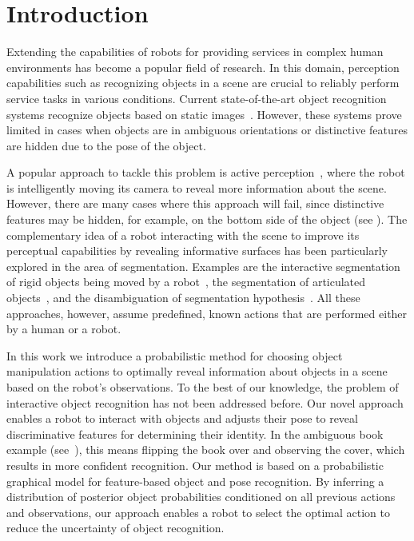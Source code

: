 
\section{Introduction}
    \vspace{-0.5ex}


Extending the capabilities of robots for providing services in complex human environments has become a popular field of research.
In this domain, perception capabilities such as recognizing objects in a scene are crucial to reliably perform service tasks in various conditions.
Current state-of-the-art object recognition systems recognize objects based on static images~\cite{tang2012textured,van2013fusing}.
However, these systems prove limited in cases when objects are in ambiguous orientations or distinctive features are hidden due to the pose of the object.

A popular approach to tackle this problem is active perception~\cite{atanasov2013hypothesis}, where the robot is intelligently moving its camera to reveal more information about the scene.
However, there are many cases where this approach will fail, since distinctive features may be hidden, for example, on the bottom side of the object (see ).
The complementary idea of a robot interacting with the scene to improve its perceptual capabilities by revealing informative surfaces has been particularly explored in the area of segmentation.
Examples are the interactive segmentation of rigid objects being moved by a robot~\cite{KenneyInteractive}, the segmentation of articulated objects~\cite{Katz-WS-MM-ICRA2011}, and the disambiguation of segmentation hypothesis~\cite{bergstrom11icvs}.
All these approaches, however, assume predefined, known actions that are performed either by a human or a robot.

In this work we introduce a probabilistic method for choosing object manipulation actions to optimally reveal information about objects in a scene based on the robot's observations.
To the best of our knowledge, the problem of interactive object recognition has not been addressed before. 
Our novel approach enables a robot to interact with objects and adjusts their pose to reveal discriminative features for determining their identity.
In the ambiguous book example (see~), this means flipping the book over and observing the cover, which results in more confident recognition.
Our method is based on a probabilistic graphical model for feature-based object and pose recognition.
By inferring a distribution of posterior object probabilities conditioned on all previous actions and observations, our approach enables a robot to select the optimal action to reduce the uncertainty of object recognition.

